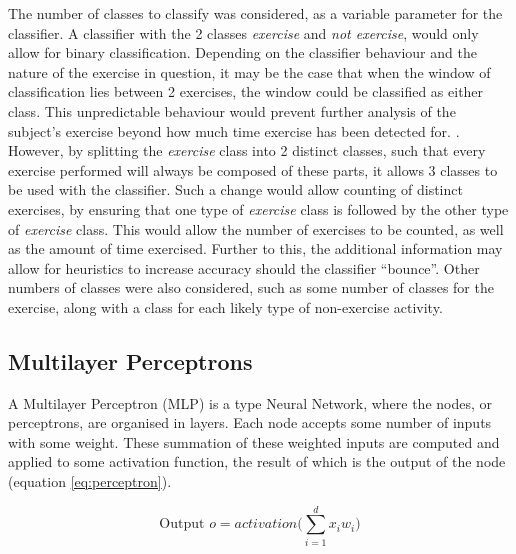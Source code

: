 The number of classes to classify was considered, as a variable parameter for the classifier. A classifier with the 2 classes \textit{exercise}  and \textit{not exercise}, would only allow for binary classification. Depending on the classifier behaviour and the nature of the exercise in question, it may be the case that when the window of classification lies between 2 exercises, the window could be classified as either class. This unpredictable behaviour would prevent further analysis of the subject's exercise beyond how much time exercise has been detected for. . However, by splitting the \textit{exercise} class into 2 distinct classes, such that every exercise performed will always be composed of these parts, it allows 3 classes to be used with the classifier. Such a change would allow counting of distinct exercises, by ensuring that one type of \textit{exercise} class is followed by the other type of \textit{exercise} class. This would allow the number of exercises to be counted, as well as the amount of time exercised. Further to this, the additional information may allow for heuristics to increase accuracy should the classifier ``bounce''.  Other numbers of classes were also considered, such as some number of classes for the exercise, along with a class for each likely type of non-exercise activity. 


\subsection{Multilayer Perceptrons}
A Multilayer Perceptron (MLP) is a type Neural Network, where the nodes, or perceptrons, are organised in layers. Each node accepts some number of inputs with some weight. These summation of these weighted inputs are computed and applied to some activation function, the result of which is the output of the node (equation \ref{eq:perceptron}).

\begin{equation}
\label{eq:perceptron}
\text{Output } o = activation\bigg(\sum_{i=1}^{d}{x_iw_i}\bigg) 
\end{equation}

